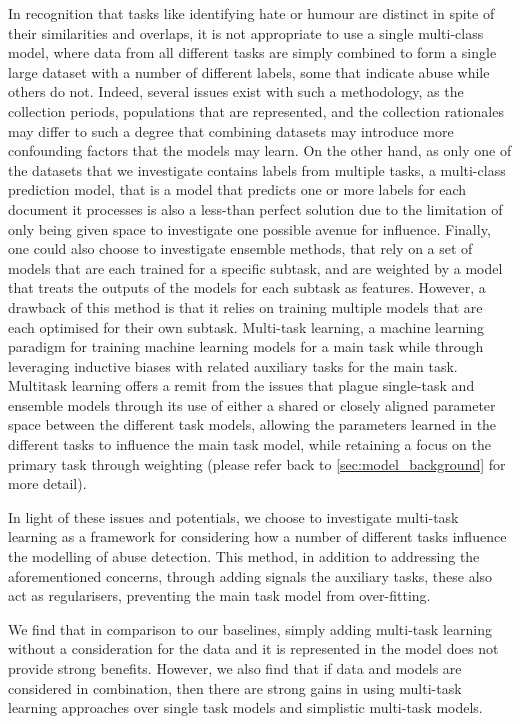 In recognition that tasks like identifying hate or humour are distinct in spite of their similarities and overlaps, it is not appropriate to use a single multi-class model, where data from all different tasks are simply combined to form a single large dataset with a number of different labels, some that indicate abuse while others do not. Indeed, several issues exist with such a methodology, as the collection periods, populations that are represented, and the collection rationales may differ to such a degree that combining datasets may introduce more confounding factors that the models may learn. On the other hand, as only one of the datasets that we investigate contains labels from multiple tasks, a multi-class prediction model, that is a model that predicts one or more labels for each document it processes is also a less-than perfect solution due to the limitation of only being given space to investigate one possible avenue for influence. Finally, one could also choose to investigate ensemble methods, that rely on a set of models that are each trained for a specific subtask, and are weighted by a model that treats the outputs of the models for each subtask as features. However, a drawback of this method is that it relies on training multiple models that are each optimised for their own subtask. Multi-task learning, a machine learning paradigm for training machine learning models for a main task while through leveraging inductive biases with related auxiliary tasks for the main task. Multitask learning offers a remit from the issues that plague single-task and ensemble models through its use of either a shared or closely aligned parameter space between the different task models, allowing the parameters learned in the different tasks to influence the main task model, while retaining a focus on the primary task through weighting (please refer back to \autoref{sec:model_background} for more detail).

In light of these issues and potentials, we choose to investigate multi-task learning as a framework for considering how a number of different tasks influence the modelling of abuse detection. This method, in addition to addressing the aforementioned concerns, through adding signals the auxiliary tasks, these also act as regularisers, preventing the main task model from over-fitting.

We find that in comparison to our baselines, simply adding multi-task learning without a consideration for the data and it is represented in the model does not provide strong benefits. However, we also find that if data and models are considered in combination, then there are strong gains in using multi-task learning approaches over single task models and simplistic multi-task models.

